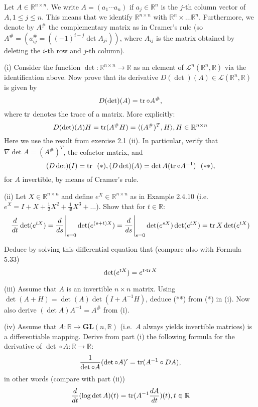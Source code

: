 \begin{exercise}{44}
    Let $A \in \mathbb{R}^{n \times n}$. We write $A = (a_1 \cdots a_n)$ if $a_j \in \mathbb{R}^n$ is the $j$-th column vector of $A, 1 \leq j \leq n$.
    This means that we identify $\mathbb{R}^{n \times n}$ with $\mathbb{R}^n \times \ldots \mathbb{R}^n$.
    Furthermore, we denote by $A^{\#}$ the complementary matrix as in Cramer's rule (so $A^{\#} = (a_{ij}^{\#} = ((-1)^{i - j}\det A_{ji}))$, where $A_{ij}$ is the matrix obtained by deleting the $i$-th row and $j$-th column).

    (i) Consider the function $\det: \mathbb{R}^{n \times n} \rightarrow \mathbb{R}$ as an element of $\mathcal{L}^{n}(\mathbb{R}^n, \mathbb{R})$ via the identification above.
    Now prove that its derivative $D (\det)(A) \in \mathcal{L}(\mathbb{R}^n, \mathbb{R})$ is given by
    $$D(\det)(A) = \operatorname{tr} \circ A^{\#},$$
    where $\operatorname{tr}$ denotes the trace of a matrix.
    More explicitly:
    $$D(\det)(A) H = \operatorname{tr}(A^{\#}H) = \langle (A^{\#})^T, H \rangle, H \in \mathbb{R}^{n \times n}$$
    Here we use the result from exercise 2.1 (ii).
    In particular, verify that $\nabla \det A = (A^{\#})^T$, the cofactor matrix, and
    $$(D \det)(I) = \operatorname{tr} \ \ (*), (D \det)(A) = \det A (\operatorname{tr} \circ A^{-1}) \ \ (**),$$
    for $A$ invertible, by means of Cramer's rule.

    (ii) Let $X \in \mathbb{R}^{n \times n}$ and define $e^X \in \mathbb{R}^{n \times n}$ as in Example 2.4.10 (i.e. $e^X = I +  X + \frac{1}{2}X^2 + \frac{1}{3!}X^3 + \ldots$).
    Show that for $t \in \mathbb{R}$:
    $$\frac{d}{dt} \det(e^{tX}) = \frac{d}{ds} \Biggr \rvert_{s=0} \det(e^{(s+ t)X}) = \frac{d}{ds} \Biggr \rvert_{s = 0} \det(e^{sX}) \det(e^{tX}) = \operatorname{tr} X \det(e^{tX})$$

    Deduce by solving this differential equation that (compare also with Formula 5.33)
    $$\det(e^{tX}) = e^{t \cdot \operatorname{tr} X}$$

    (iii) Assume that $A$ is an invertible $n \times n$ matrix.
    Using $\det(A + H) = \det(A) \det(I + A^{-1}H)$, deduce (**) from (*) in (i).
    Now also derive $(\det A)A^{-1} = A^{\#}$ from (i).

    (iv) Assume that $A: \mathbb{R} \rightarrow \mathbf{GL}(n, \mathbb{R})$ (i.e.\ $A$ always yields invertible matrices) is a differentiable mapping.
    Derive from part (i) the following formula for the derivative of $\det \circ A: \mathbb{R} \rightarrow \mathbb{R}$:
    $$\frac{1}{\det \circ A}(\det \circ A)' = \operatorname{tr}(A^{-1} \circ DA),$$
    in other words (compare with part (ii))
    $$\frac{d}{dt}(\log \det A)(t) = \operatorname{tr}(A^{-1} \frac{dA}{dt})(t), t \in \mathbb{R}$$


\end{exercise}
